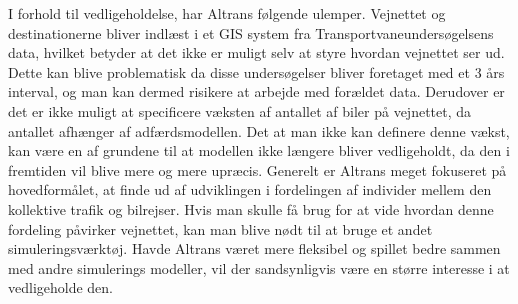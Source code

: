 \vspace{5mm}

I forhold til vedligeholdelse, har Altrans følgende ulemper. Vejnettet og destinationerne bliver indlæst i et GIS system fra Transportvaneundersøgelsens data, hvilket betyder at det ikke er muligt selv at styre hvordan vejnettet ser ud. Dette kan blive problematisk da disse undersøgelser bliver foretaget med et 3 års interval, og man kan dermed risikere at arbejde med forældet data. Derudover er det er ikke muligt at specificere væksten af antallet af biler på vejnettet, da antallet afhænger af adfærdsmodellen. Det at man ikke kan definere denne vækst, kan være en af grundene til at modellen ikke længere bliver vedligeholdt, da den i fremtiden vil blive mere og mere upræcis. Generelt er Altrans meget fokuseret på hovedformålet, at finde ud af udviklingen i fordelingen af individer mellem den kollektive trafik og bilrejser. Hvis man skulle få brug for at vide hvordan denne fordeling påvirker vejnettet, kan man blive nødt til at bruge et andet simuleringsværktøj. Havde Altrans været mere fleksibel og spillet bedre sammen med andre simulerings modeller, vil der sandsynligvis være en større interesse i at vedligeholde den.